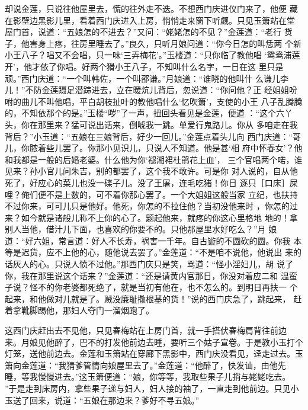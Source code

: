 却说金莲，只说往他屋里去，慌的往外走不迭。不想西门庆进仪门来了，他便
藏在影壁边黑影儿里，看着西门庆进入上房，悄悄走来窗下听觑。只见玉箫站在堂
屋门首，说道：“五娘怎的不进去？”又问：“姥姥怎的不见？”金莲道：“老行
货子，他害身上疼，往房里睡去了。”良久，只听月娘问道：“你今日怎的叫恁两
个新小王八子？唱又不会唱，只一味‘三弄梅花’。”玉楼道：“只你临了教他唱
‘鸳鸯浦莲开’，他才依了你唱。好两个猾小王八子，不知叫什么名字，一日在这
里只是顽。”西门庆道：“一个叫韩佐，一个叫邵谦。”月娘道：“谁晓的他叫什
么谦儿李儿！”不防金莲蹑足潜踪进去，立在暖炕儿背后，忽说道：“你问他？正
经姐姐吩咐的曲儿不叫他唱，平白胡枝扯叶的教他唱什么‘忆吹箫’，支使的小王
八子乱腾腾的，不知依那个的是。”玉楼“哕”了一声，扭回头看见是金莲，便道
：“这个六丫头，你在那里来？猛可说出话来，倒唬我一跳。单爱行鬼路儿。你从
多咱走在我背后？”小玉道：“五娘在三娘背后，好少一回儿。”金莲点着头儿向
西门庆道：“哥儿，你脓着些儿罢了。你那小见识儿，只说人不知道。他是甚‘相
府中怀春女’？他和我都是一般的后婚老婆。什么他为你‘褪湘裙杜鹃花上血’，
三个官唱两个喏，谁见来？孙小官儿问朱吉，别的都罢了，这个我不敢许。可是你
对人说的，自从他死了，好应心的菜儿也没一碟子儿。没了王屠，连毛吃猪！你日
逐只［口床］屎哩？俺们便不是上数的，可不着你那心罢了。一个大姐姐这般当家
立纪，也扶持不过你来，可可儿只是他好。他死，你怎的不拉住他？当初没他来时
，你怎的过来？如今就是诸般儿称不上你的心了。题起他来，就疼的你这心里格地
地的！拿别人当他，借汁儿下面，也喜欢的你要不的。只他那屋里水好吃么？”月
娘道：“好六姐，常言道：好人不长寿，祸害一千年。自古镟的不圆砍的圆。你我
本等是迟货，应不上他的心，随他说去罢了。”金莲道：“不是咱不说他，他说出
来的话灰人的心。只说人愤不过他。”那西门庆只是笑，骂道：“怪小淫妇儿，胡
说了你，我在那里说这个话来？”金莲道：“还是请黄内官那日，你没对着应二和
温蛮子说？怪不的你老婆都死绝了，就是当初有他在，也不怎么的。到明日再扶一
个起来，和他做对儿就是了。贼没廉耻撒根基的货！”说的西门庆急了，跳起来，
赶着拿靴脚踢他，那妇人夺门一溜烟跑了。

这西门庆赶出去不见他，只见春梅站在上房门首，就一手搭伏春梅肩背往前边
来。月娘见他醉了，巴不的打发他前边去睡，要听三个姑子宣卷。于是教小玉打个
灯笼，送他前边去。金莲和玉箫站在穿廊下黑影中，西门庆没看见，迳走过去。玉
箫向金莲道：“我猜爹管情向娘屋里去了。”金莲道：“他醉了，快发讪，由他先
睡，等我慢慢进去。”这玉箫便道：“娘，你等等，我取些果子儿捎与姥姥吃去。
”于是走到床房内，拿些果子递与妇人，妇人接的袖了，一直走到他前边。只见小
玉送了回来，说道：“五娘在那边来？爹好不寻五娘。”

